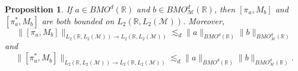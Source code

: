 \documentclass[oneside,english,a4wide]{amsart}
\numberwithin{equation}{section}
\numberwithin{figure}{section}
\theoremstyle{plain}
\theoremstyle{plain}
\newtheorem{proposition}[thm]{Proposition}
\theoremstyle{definition}
\theoremstyle{plain}
\theoremstyle{remark}
\theoremstyle{definition}
\theoremstyle{remark}
\theoremstyle{definition}
\newcommand{\8}{\infty}
\begin{document}
\begin{proposition}\label{T2est}
	If $a\in BMO^d(\mathbb{R})$ and $b\in BMO^d_\mathcal{M}(\mathbb{R})$, then $[\pi_a,M_b]$ and $[\pi_a^*,M_b]$ are both bounded on $L_2(\mathbb{R},L_2(\mathcal{M}))$. Moreover, 
	\begin{equation*}
		\|[\pi_a,M_b]\|_{L_2(\mathbb{R},L_2(\mathcal{M}))\to L_2(\mathbb{R},L_2(\mathcal{M}))}\lesssim_d \|a\|_{BMO^d(\mathbb{R})}\|b\|_{BMO^d_{\mathcal{M}}(\mathbb{R})}
	\end{equation*}
and
\begin{equation*}
	\|[\pi_a^*,M_b]\|_{L_2(\mathbb{R},L_2(\mathcal{M}))\to L_2(\mathbb{R},L_2(\mathcal{M}))}\lesssim_d \|a\|_{BMO^d(\mathbb{R})}\|b\|_{BMO^d_{\mathcal{M}}(\mathbb{R})}.
\end{equation*}
\end{proposition}
\end{document}
